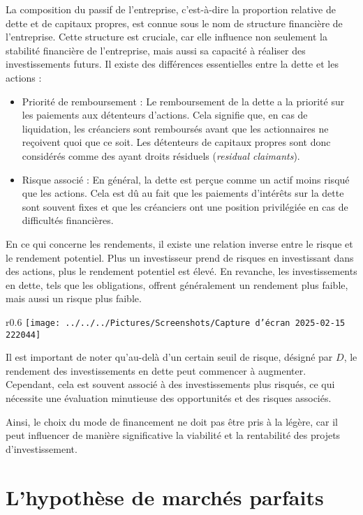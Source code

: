 \documentclass[a4paper, 12pt]{report}
\begin{document}
La composition du passif de l'entreprise, c'est-à-dire la proportion relative de dette et de capitaux propres, est connue sous le nom de structure financière de l'entreprise. Cette structure est cruciale, car elle influence non seulement la stabilité financière de l'entreprise, mais aussi sa capacité à réaliser des investissements futurs.
\noindent
Il existe des différences essentielles entre la dette et les actions :

\begin{itemize}
	\item Priorité de remboursement : Le remboursement de la dette a la priorité sur les paiements aux détenteurs d'actions. Cela signifie que, en cas de liquidation, les créanciers sont remboursés avant que les actionnaires ne reçoivent quoi que ce soit. Les détenteurs de capitaux propres sont donc considérés comme des ayant droits résiduels (\textit{residual claimants}).
	\item Risque associé : En général, la dette est perçue comme un actif moins risqué que les actions. Cela est dû au fait que les paiements d'intérêts sur la dette sont souvent fixes et que les créanciers ont une position privilégiée en cas de difficultés financières.
\end{itemize}

En ce qui concerne les rendements, il existe une relation inverse entre le risque et le rendement potentiel. Plus un investisseur prend de risques en investissant dans des actions, plus le rendement potentiel est élevé. En revanche, les investissements en dette, tels que les obligations, offrent généralement un rendement plus faible, mais aussi un risque plus faible. 

\begin{wrapfigure}{r}{0.6\textwidth}
	\centering
	\texttt{[image: ../../../Pictures/Screenshots/Capture d'écran 2025-02-15 222044]}
\end{wrapfigure}

Il est important de noter qu'au-delà d'un certain seuil de risque, désigné par \( D \), le rendement des investissements en dette peut commencer à augmenter. Cependant, cela est souvent associé à des investissements plus risqués, ce qui nécessite une évaluation minutieuse des opportunités et des risques associés.

Ainsi, le choix du mode de financement ne doit pas être pris à la légère, car il peut influencer de manière significative la viabilité et la rentabilité des projets d'investissement.

\section{L'hypothèse de marchés parfaits}
\end{document}

